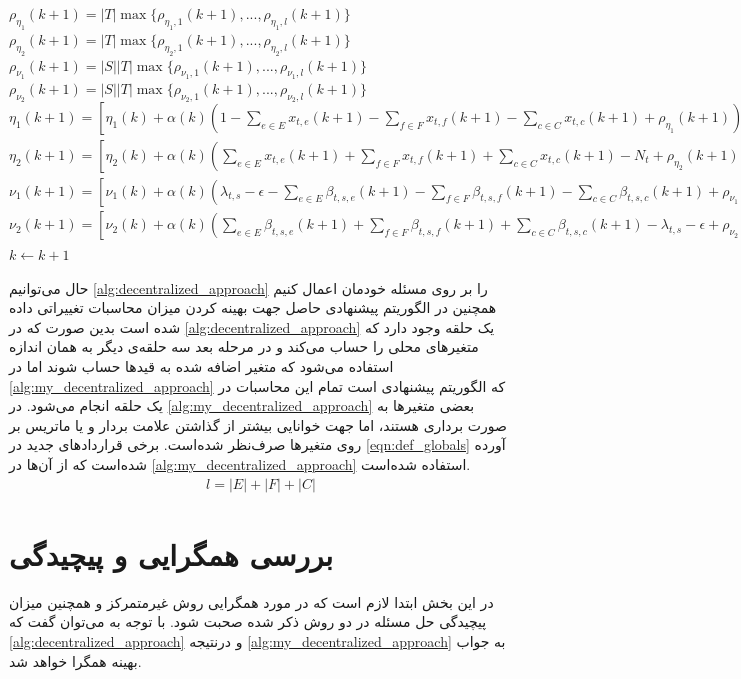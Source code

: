 \begin{latin}
	\begin{algorithm}                     
		\begin{algorithmic} [1]              
			\State $\rho_{\eta_1}(k+1) = |T| \max \{ \rho_{\eta_1,1}(k+1), ..., \rho_{\eta_1,l}(k+1)\}$
			\State $\rho_{\eta_2}(k+1) = |T| \max \{ \rho_{\eta_2,1}(k+1), ..., \rho_{\eta_2,l}(k+1)\}$
			\State $\rho_{\nu_1}(k+1) = |S||T| \max \{ \rho_{\nu_1,1}(k+1), ..., \rho_{\nu_1,l}(k+1)\}$
			\State $\rho_{\nu_2}(k+1) = |S||T| \max \{ \rho_{\nu_2,1}(k+1), ..., \rho_{\nu_2,l}(k+1)\}$
			\State $\eta_1(k+1) = [\eta_1(k) + \alpha(k)(1-\sum_{e \in E}x_{t,e}(k+1) - \sum_{f \in F}x_{t,f}(k+1) - \sum_{c \in C}x_{t,c}(k+1)+\rho_{\eta_1}(k+1))]_+$
			\State $\eta_2(k+1) = [\eta_2(k) + \alpha(k)(\sum_{e \in E}x_{t,e}(k+1) + \sum_{f \in F}x_{t,f}(k+1) + \sum_{c \in C}x_{t,c}(k+1) - N_t +\rho_{\eta_2}(k+1))]_+$
			\State $\nu_1(k+1) = [\nu_1(k) + \alpha(k)( \lambda_{t,s} - \epsilon - \sum_{e \in E}\beta_{t,s,e}(k+1) - \sum_{f \in F}\beta_{t,s,f}(k+1) - \sum_{c \in C}\beta_{t,s,c}(k+1) +\rho_{\nu_1}(k+1))]_+$
			\State $\nu_2(k+1) = [\nu_2(k) + \alpha(k)( \sum_{e \in E}\beta_{t,s,e}(k+1) + \sum_{f \in F}\beta_{t,s,f}(k+1) + \sum_{c \in C}\beta_{t,s,c}(k+1) -\lambda_{t,s} - \epsilon + \rho_{\nu_2}(k+1))]_+$
			\State $k \gets k+1$ 
			\EndProcedure
		\end{algorithmic}
	\end{algorithm}
\end{latin}
حال می‌توانیم \cref{alg:decentralized_approach} را بر روی مسئله خودمان اعمال کنیم همچنین در الگوریتم پیشنهادی حاصل جهت بهینه کردن میزان محاسبات تغییراتی داده شده است بدین صورت که در \cref{alg:decentralized_approach} یک حلقه‌ وجود دارد که متغیرهای محلی را حساب می‌کند و در مرحله بعد سه حلقه‌ی دیگر به همان اندازه استفاده می‌شود که متغیر اضافه شده به قیدها حساب شوند اما در \cref{alg:my_decentralized_approach} که الگوریتم پیشنهادی است تمام این محاسبات در یک حلقه انجام می‌شود. در \cref{alg:my_decentralized_approach} بعضی متغیرها به صورت برداری هستند، اما جهت خوانایی بیشتر از گذاشتن علامت بردار و یا ماتریس بر روی متغیرها صرف‌نظر شده‌است. برخی قراردادهای جدید در \cref{eqn:def_globals} آورده شده‌است که از آن‌ها در \cref{alg:my_decentralized_approach} استفاده شده‌است.
	\begin{align}\label{eqn:def_globals}
		l = |E| + |F| + |C|
	\end{align}

\section{بررسی همگرایی و پیچیدگی}
	در این بخش ابتدا لازم است که در مورد همگرایی روش غیرمتمرکز و همچنین میزان پیچیدگی حل مسئله در دو روش ذکر شده صحبت شود. 
	با توجه به \cite{vujanic2016decomposition} می‌توان گفت که \cref{alg:decentralized_approach} و درنتیجه \cref{alg:my_decentralized_approach} به جواب بهینه همگرا خواهد شد. 
	
